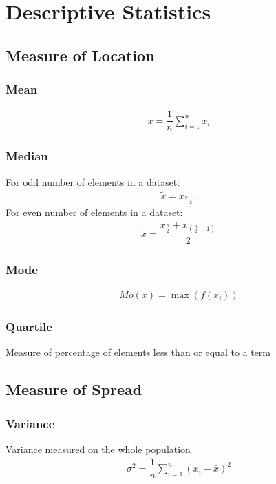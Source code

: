\documentclass[../main.tex]{subfile}
\begin{document}
    \chapter{Descriptive Statistics}
    \section{Measure of Location}
    \subsection{Mean}
    \begin{align}
        \bar{x} = \dfrac{1}{n} \displaystyle\sum_{i=1}^{n} x_i
    \end{align}

    \subsection{Median}
    For odd number of elements in a dataset:
    \begin{align}
        \tilde{x} = x_{\frac{n+1}{2}}
    \end{align}
    For even number of elements in a dataset:
    \begin{align}
        \tilde{x} = \dfrac{x_{\frac{n}{2}}+x_{\left(\frac{n}{2}+1\right)}}{2}
    \end{align}

    \subsection{Mode}
    \begin{align}
        Mo(x) = \max(f(x_i))
    \end{align}

    \subsection{Quartile}
    Measure of percentage of elements less than or equal to a term

    \section{Measure of Spread}
    \subsection{Variance}
    Variance measured on the whole population
    \begin{align}
        \sigma^2 = \dfrac{1}{n} \sum_{i=1}^{n} \left( x_i - \bar{x} \right)^2
    \end{align}
\end{document}
